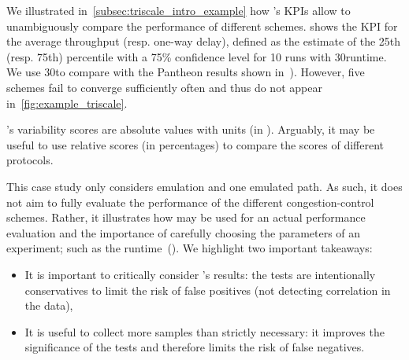 We illustrated in~\cref{subsec:triscale_intro_example} how \triscale's KPIs allow to unambiguously compare the performance of different schemes.
 shows the KPI for the average throughput (resp. one-way delay), defined as the estimate of the 25th (resp. 75th) percentile with a 75\% confidence level for 10 runs with 30\s runtime.
We use 30\s to compare with the Pantheon results shown in~).
However, five schemes fail to converge sufficiently often and thus do not appear in~\cref{fig:example_triscale}.


\begin{remark}
  \triscale's variability scores are absolute values with units (\eg in \mbps). Arguably, it may be useful to use relative scores (in percentages) to compare the scores of different protocols.
\end{remark}

This case study only considers emulation and one emulated path. As such, it does not aim to fully evaluate the performance of the different congestion-control schemes.
Rather, it illustrates how \triscale may be used for an actual performance evaluation and the importance of carefully choosing the parameters of an experiment; such as the runtime~().
We highlight two important takeaways:
\begin{itemize}
  \item It is important to critically consider \triscale's results: the tests are intentionally conservatives to limit the risk of false positives (\eg not detecting correlation in the data),
  \item It is useful to collect more samples than strictly necessary: it improves the significance of the tests and therefore limits the risk of false negatives.
\end{itemize}


